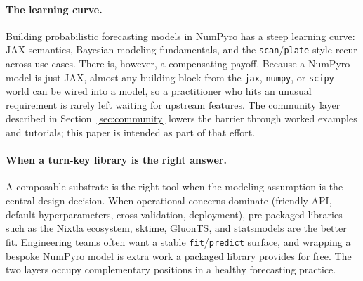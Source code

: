 \documentclass[11pt,3p,review,authoryear]{elsarticle}
\begin{document}
\paragraph{The learning curve.}
Building probabilistic forecasting models in NumPyro has a steep learning curve: JAX semantics, Bayesian modeling fundamentals, and the \texttt{scan}/\texttt{plate} style recur across use cases. There is, however, a compensating payoff. Because a NumPyro model is just JAX, almost any building block from the \texttt{jax}, \texttt{numpy}, or \texttt{scipy} world can be wired into a model, so a practitioner who hits an unusual requirement is rarely left waiting for upstream features. The community layer described in Section~\ref{sec:community} lowers the barrier through worked examples and tutorials; this paper is intended as part of that effort.

\paragraph{When a turn-key library is the right answer.}
A composable substrate is the right tool when the modeling assumption is the central design decision. When operational concerns dominate (friendly API, default hyperparameters, cross-validation, deployment), pre-packaged libraries such as the Nixtla ecosystem, sktime, GluonTS, and statsmodels \citep{nixtla2024, loning2019sktime, alexandrov2020gluonts, statsmodels} are the better fit. Engineering teams often want a stable \texttt{fit}/\texttt{predict} surface, and wrapping a bespoke NumPyro model is extra work a packaged library provides for free. The two layers occupy complementary positions in a healthy forecasting practice.
\end{document}
